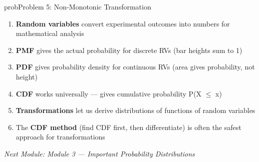 \begin{PSbox}[unbreakable]{prob}{Problem 5: Non-Monotonic Transformation}
\begin{Shaded}
\begin{Highlighting}[]
 \OperatorTok{=} \OperatorTok{;}
 \OperatorTok{=} \OperatorTok{*}\NormalTok{(}\OperatorTok{,}\NormalTok{) }\OperatorTok{{-}} \OperatorTok{;}   
 \OperatorTok{=} \OperatorTok{;}
\NormalTok{(}\OperatorTok{,} \OperatorTok{,} \OperatorTok{,} \NormalTok{)}\OperatorTok{;}
 \OperatorTok{;}
 \OperatorTok{=} \NormalTok{(}\OperatorTok{,} \OperatorTok{,} \NormalTok{)}\OperatorTok{;}
\NormalTok{(}\OperatorTok{,} \NormalTok{(}\OperatorTok{*}\NormalTok{(}\NormalTok{))}\OperatorTok{,} \OperatorTok{,} \OperatorTok{,} \NormalTok{)}\OperatorTok{;}
\NormalTok{(}\OperatorTok{,} \NormalTok{)}\OperatorTok{;}
\NormalTok{(}\NormalTok{)}\OperatorTok{;} \NormalTok{(}\NormalTok{)}\OperatorTok{;}
\end{Highlighting}
\end{Shaded}

\end{PSbox}


\begin{enumerate}
\def\labelenumi{\arabic{enumi}.}
\tightlist
\item
  \textbf{Random variables} convert experimental outcomes into numbers for mathematical analysis
\item
  \textbf{PMF} gives the actual probability for discrete RVs (bar heights sum to 1)
\item
  \textbf{PDF} gives probability density for continuous RVs (area gives probability, not height)
\item
  \textbf{CDF} works universally — gives cumulative probability P(X \ensuremath{\le} x)
\item
  \textbf{Transformations} let us derive distributions of functions of random variables
\item
  The \textbf{CDF method} (find CDF first, then differentiate) is often the safest approach for transformations
\end{enumerate}

\emph{Next Module: {Module 3 — Important Probability Distributions}}
